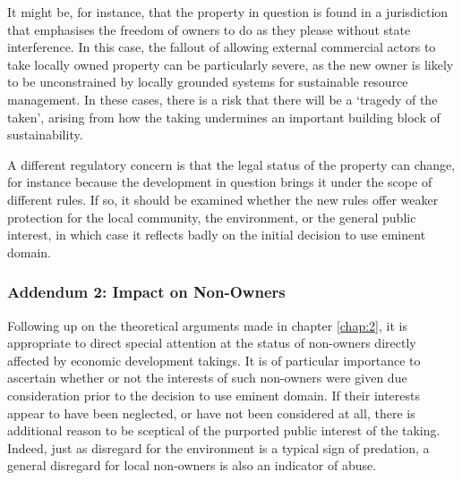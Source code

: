 It might be, for instance, that the property in question is found in a jurisdiction that emphasises  the freedom of owners to do as they please without state interference. In this case, the fallout of allowing external commercial actors to take locally owned property can be particularly severe, as the new owner is likely to be unconstrained by locally grounded systems for sustainable resource management. In these cases, there is a risk that there will be a `tragedy of the taken', arising from how the taking undermines an important building block of sustainability. 


A different regulatory concern is that the legal status of the property can change, for instance because the development in question brings it under the scope of different rules. If so, it should be examined whether the new rules offer weaker protection for the local community, the environment, or the general public interest, in which case it reflects badly on the initial decision to use eminent domain.%

\subsubsection*{Addendum 2: Impact on Non-Owners}

Following up on the theoretical arguments made in chapter \ref{chap:2}, it is appropriate to direct special attention at the status of non-owners directly affected by economic development takings. It is of particular importance to ascertain whether or not the interests of such non-owners were given due consideration prior to the decision to use eminent domain. If their interests appear to have been neglected, or have not been considered at all, there is additional reason to be sceptical of the purported public interest of the taking. Indeed, just as disregard for the environment is a typical sign of predation, a general disregard for local non-owners is also an indicator of abuse.

